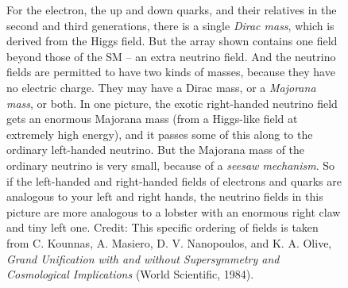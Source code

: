 \documentclass[12pt]{iopart}
\begin{document}
\begin{figure}[htbp]
{\newline \indent
For the electron, the up and down quarks, and their relatives in the second and third generations, there is a single \textit{Dirac mass}, which is derived from the Higgs field. But the array shown contains one field beyond those of the SM --  an extra neutrino field. And the neutrino fields are permitted to have two kinds of masses, because they have no electric charge. They may have a Dirac mass, or a \textit{Majorana mass}, or both. 
\newline \indent
In one picture, the exotic right-handed neutrino field gets an enormous Majorana mass (from a Higgs-like field at extremely high energy), and it passes some of this along to the ordinary left-handed  neutrino. But the Majorana mass of the ordinary neutrino is very small, because of a \textit{seesaw mechanism}. So if the left-handed and right-handed fields of electrons and quarks are analogous to your left and right hands, the neutrino fields in this picture are more analogous to a lobster with an enormous right claw and tiny left one. Credit: This specific ordering of fields is taken from C. Kounnas, A. Masiero, D. V. Nanopoulos, and K. A. Olive, \textit{Grand Unification with and without Supersymmetry and
Cosmological Implications} (World Scientific, 1984). \label{Fig7b-fields.eps}}
 \end{figure}
\end{document}
